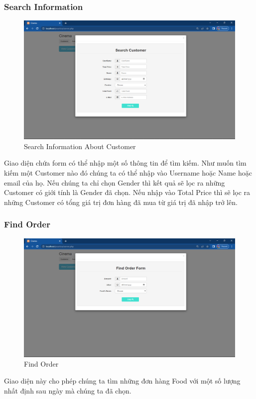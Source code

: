 \subsubsection{Search Information}
\begin{figure}[H]
    \centering
    \includegraphics[scale=0.45]{images/searchAndFilter_Customer.png}
    \caption{Search Information About Customer}
\end{figure}
Giao diện chứa form có thể nhập một số thông tin để tìm kiếm. Như muốn tìm kiếm một Customer nào đó chúng ta có thể nhập vào Username hoặc Name hoặc email của họ. Nếu chúng ta chỉ chọn Gender thì kết quả sẽ lọc ra những Customer có giới tính là Gender đã chọn. Nếu nhập vào Total Price thì sẽ lọc ra những Customer có tổng giá trị đơn hàng đã mua từ giá trị đã nhập trở lên.

\subsubsection{Find Order}
\begin{figure}[H]
    \centering
    \includegraphics[scale=0.45]{images/findOrder.png}
    \caption{Find Order}
\end{figure}
Giao diện này cho phép chúng ta tìm những đơn hàng Food với một số lượng nhất định sau ngày mà chúng ta đã chọn.


